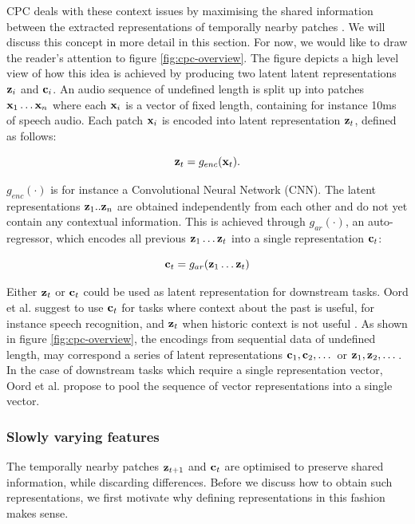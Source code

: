 	CPC deals with these context issues by maximising the shared information between the extracted representations of temporally nearby patches \citep{lowePuttingEndEndtoEnd2020}. We will discuss this concept in more detail in this section. For now, we would like to draw the reader's attention to figure \ref{fig:cpc-overview}. The figure depicts a high level view of how this idea is achieved by producing two latent latent representations $\mathbf{z}_i$ and $\mathbf{c}_i$. An audio sequence of undefined length is split up into patches $\mathbf{x}_1 \dots \mathbf{x}_n$ where each $\mathbf{x}_i$ is a vector of fixed length, containing for instance 10ms of speech audio. Each patch $\mathbf{x}_i$ is encoded into latent representation $\mathbf{z}_t$, defined as follows:
	
	$$
	\mathbf{z}_t = g_{enc}(\mathbf{x}_t) .
	$$
	
	$g_{enc}( \cdot )$ is for instance a Convolutional Neural Network (CNN). The latent representations $\mathbf{z}_1..\mathbf{z}_n$ are obtained independently from each other and do not yet contain any contextual information. This is achieved through $g_{ar}( \cdot )$, an auto-regressor, which encodes all previous $\mathbf{z}_1 \dots \mathbf{z}_t$ into a single representation $\mathbf{c}_t$:
	
	$$
	\mathbf{c}_t = g_{ar}(\mathbf{z}_1 \dots \mathbf{z}_t)
	$$
	
	Either $\mathbf{z}_t$ or $\mathbf{c}_t$ could be used as latent representation for downstream tasks. Oord et al. suggest to use $\mathbf{c}_t$ for tasks where context about the past is useful, for instance speech recognition, and $\mathbf{z}_t$ when historic context is not useful \citep{oordRepresentationLearningContrastive2019}. As shown in figure \ref{fig:cpc-overview}, the encodings from sequential data of undefined length, may correspond a series of latent representations $\mathbf{c}_1, \mathbf{c}_2, \dots $ or $\mathbf{z}_1, \mathbf{z}_2, \dots $. In the case of downstream tasks which require a single representation vector, Oord et al. propose to pool the sequence of vector representations into a single vector.
	

\subsubsection{Slowly varying features}
	The temporally nearby patches $\mathbf{z}_{t+1}$ and $\mathbf{c}_t$ are optimised to preserve shared information, while discarding differences. Before we discuss how to obtain such representations, we first motivate why defining representations in this fashion makes sense.
	
